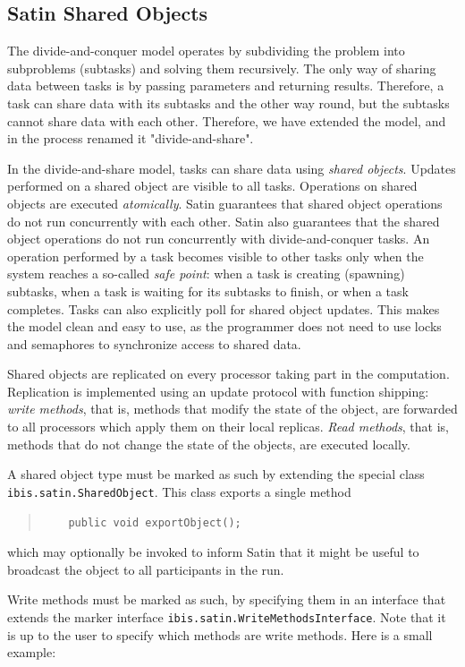 \documentclass[10pt]{article}
\newcommand{\mysubsection}[1]{\subsection{#1}\label{#1}}
\begin{document}
\mysubsection{Satin Shared Objects}

The divide-and-conquer model operates by subdividing the problem into
subproblems (subtasks) and solving them recursively.
The only way of sharing data between tasks is by passing parameters
and returning results.
Therefore, a task can share data with its subtasks and the
other way round, but the subtasks cannot share data with each other.
Therefore, we have extended the model, and in the process renamed it
"divide-and-share".

In the divide-and-share model, tasks can share data using
\textit{shared objects}.
Updates performed on a shared object are visible to all tasks.
Operations on shared objects are executed \textit{atomically}.
Satin guarantees that shared object operations do not run concurrently with
each other. Satin also guarantees that the shared object operations do not
run concurrently with divide-and-conquer tasks. An operation performed
by a task becomes visible to other tasks only when the system reaches a
so-called \textit{safe point}: when a task is creating (spawning)
subtasks, when a task is waiting for its subtasks to finish, or when a
task completes. Tasks can also explicitly poll for shared object
updates. This makes the model clean and easy to use, as the programmer
does not need to use locks and semaphores to synchronize access to
shared data.

Shared objects are replicated on every
processor taking part in the computation. Replication is implemented using
an update protocol with function shipping: \textit{write methods},
that is, methods that modify
the state of the object, are forwarded to all processors
which apply them on their local replicas. \textit{Read methods}, that
is, methods that do not change the state of the objects, are
executed locally. 

A shared object type must be marked as such by extending the special class
\texttt{ibis.satin.SharedObject}.
This class exports a single method
{\small
\begin{quote}
\begin{verbatim}
    public void exportObject();
\end{verbatim}
\end{quote}
}
which may optionally be invoked to inform Satin that it might be useful to
broadcast the object to all participants in the run. 

Write methods must be marked as such, by specifying them in an interface
that extends the marker interface \texttt{ibis.satin.WriteMethodsInterface}.
Note that it is up to the user to specify which methods are write methods.
Here is a small example:
\end{document}
